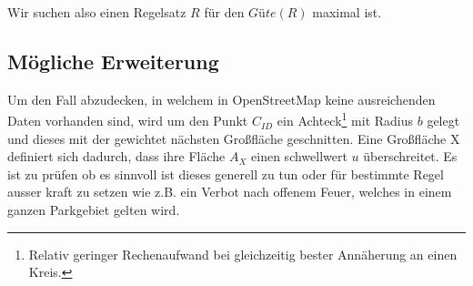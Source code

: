 Wir suchen also einen Regelsatz $R$ für den $Güte(R)$ maximal ist.

\subsection{Mögliche Erweiterung}
Um den Fall abzudecken, in welchem in OpenStreetMap keine ausreichenden Daten vorhanden sind, wird um den Punkt $C_{ID}$ ein
Achteck\footnote{Relativ geringer Rechenaufwand bei gleichzeitig bester Annäherung an einen Kreis.} mit Radius $b$ gelegt
und dieses mit der gewichtet nächsten Großfläche geschnitten.
Eine Großfläche X definiert sich dadurch, dass ihre Fläche $A_X$ einen schwellwert $u$ überschreitet.
Es ist zu prüfen ob es sinnvoll ist dieses generell zu tun oder für bestimmte Regel ausser kraft zu setzen wie
z.B. ein Verbot nach offenem Feuer, welches in einem ganzen Parkgebiet gelten wird.
